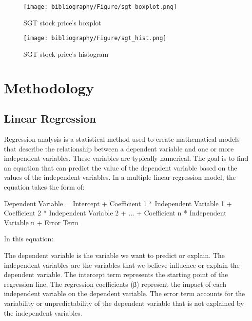 \documentclass{ieeeojies}
\begin{document}
\begin{figure}[H]
    \centering
    \begin{minipage}{0.23\textwidth}
    \centering
    \texttt{[image: bibliography/Figure/sgt\_boxplot.png]}
    \caption{SGT stock price's boxplot}
    \label{fig:1}
    \end{minipage}
    \hfill
    \begin{minipage}{0.23\textwidth}
    \centering
    \texttt{[image: bibliography/Figure/sgt\_hist.png]}
    \caption{SGT stock price's histogram}
    \label{fig:2}
    \end{minipage}
\end{figure}

\section{Methodology}
\subsection{Linear Regression}
Regression analysis is a statistical method used to create mathematical models that describe the relationship between a dependent variable and one or more independent variables. These variables are typically numerical. The goal is to find an equation that can predict the value of the dependent variable based on the values of the independent variables. In a multiple linear regression model, the equation takes the form of:

Dependent Variable = Intercept + Coefficient 1 * Independent Variable 1 + Coefficient 2 * Independent Variable 2 + ... + Coefficient n * Independent Variable n + Error Term

In this equation:

The dependent variable is the variable we want to predict or explain.
The independent variables are the variables that we believe influence or explain the dependent variable.
The intercept term represents the starting point of the regression line.
The regression coefficients (β) represent the impact of each independent variable on the dependent variable.
The error term accounts for the variability or unpredictability of the dependent variable that is not explained by the independent variables.
 
\end{document}
